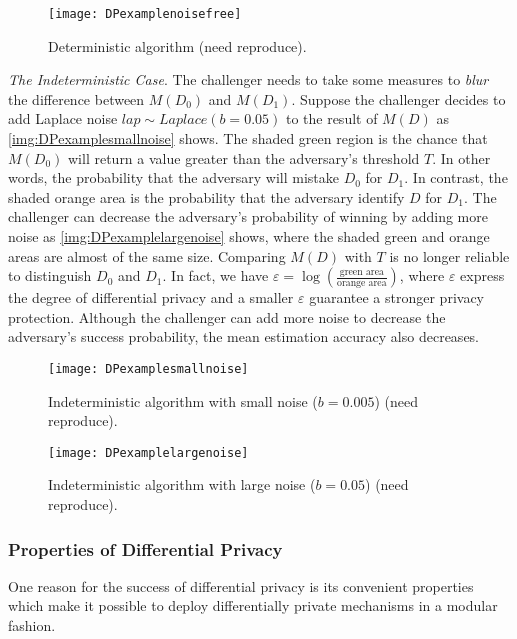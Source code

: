 \begin{figure}[htbp]
    \texttt{[image: DPexamplenoisefree]}
    \centering
    \caption{Deterministic algorithm (need reproduce).}
    \label{img:DPexamplenoisefree}
\end{figure}
\FloatBarrier

\textit{The Indeterministic Case}. The challenger needs to take some measures to \textit{blur} the difference between $M\left( D_{0}\right)$ and $M\left( D_{1}\right)$. Suppose the challenger decides to add Laplace noise $lap\sim Laplace\left(b=0.05\right)$ to the result of $M\left(D\right)$ as \autoref{img:DPexamplesmallnoise} shows. The shaded green region is the chance that $M\left( D_{0}\right)$ will return a value greater than the adversary's threshold $T$. In other words, the probability that the adversary will mistake $D_{0}$ for $D_{1}$. In contrast, the shaded orange area is the probability that the adversary identify $D$ for $D_{1}$. The challenger can decrease the adversary's probability of winning by adding more noise as \autoref{img:DPexamplelargenoise} shows, where the shaded green and orange areas are almost of the same size. Comparing $M\left( D\right)$ with $T$ is no longer reliable to distinguish $D_{0}$ and $D_{1}$. In fact, we have
$\varepsilon=\log \left( \frac{\text{green area}}{\text{orange area}}\right) $, where $\varepsilon$ express the degree of differential privacy and a smaller $\varepsilon$ guarantee a stronger privacy protection. Although the challenger can add more noise to decrease the adversary's success probability, the mean estimation accuracy also decreases.


\begin{figure}[htbp]
    \texttt{[image: DPexamplesmallnoise]}
    \centering
    \caption{Indeterministic algorithm with small noise ($b=0.005$) (need reproduce).}
    \label{img:DPexamplesmallnoise}
\end{figure}
\FloatBarrier

\begin{figure}[htbp]
    \texttt{[image: DPexamplelargenoise]}
    \centering
    \caption{Indeterministic algorithm with large noise ($b=0.05$) (need reproduce).}
    \label{img:DPexamplelargenoise}
\end{figure}
\FloatBarrier

\subsubsection{Properties of Differential Privacy}
One reason for the success of differential privacy is its convenient properties which make it possible to deploy differentially private mechanisms in a modular fashion.

